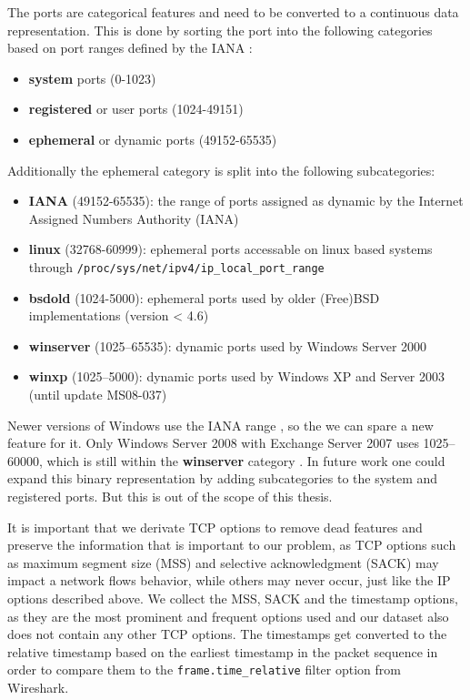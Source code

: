 \documentclass[
	ngerman,
	ruledheaders=section,%
	class=report,%
	thesis={type=bachelor},%
	accentcolor=9c,%
	custommargins=true,%
	marginpar=false,%
	parskip=half-,%
	fontsize=11pt,%
]{tudapub}
\let\code\texttt
\begin{document}
The ports are categorical features and need to be converted to a continuous data representation.
This is done by sorting the port into the following categories based on port ranges defined by the IANA \cite{ServiceNameTransport}:
\begin{itemize}
    \item \textbf{system} ports (0-1023)
    \item \textbf{registered} or user ports (1024-49151)
    \item \textbf{ephemeral} or dynamic ports (49152-65535)
\end{itemize}
Additionally the ephemeral category is split into the following subcategories:
\begin{itemize}
    \item \textbf{IANA} (49152-65535): the range of ports assigned as dynamic by the Internet Assigned Numbers Authority (IANA) \cite{ServiceNameTransport}
    \item \textbf{linux} (32768-60999): ephemeral ports accessable on linux based systems through \code{/proc/sys/net/ipv4/ip\_local\_port\_range}
    \item \textbf{bsdold} (1024-5000): ephemeral ports used by older (Free)BSD implementations (version < 4.6) \cite{EphemeralPortRange}
    \item \textbf{winserver} (1025–65535): dynamic ports used by Windows Server 2000 \cite{DefaultDynamicPort} \cite{WhenYouTry}
    \item \textbf{winxp} (1025–5000): dynamic ports used by Windows XP \cite{CableGuyDecember} and Server 2003 (until update MS08-037) \cite{YouExperienceIssues}
\end{itemize}
Newer versions of Windows use the IANA range \cite{DefaultDynamicPort}, so the we can spare a new feature for it.
Only Windows Server 2008 with Exchange Server 2007 uses 1025–60000, which is still within the \textbf{winserver} category \cite{DefaultDynamicPort}.
In future work one could expand this binary representation by adding subcategories to the system and registered ports.
But this is out of the scope of this thesis.

It is important that we derivate TCP options to remove dead features and preserve the information that is important to our problem,
as TCP options such as maximum segment size (MSS) and selective acknowledgment (SACK) may impact a network flows behavior,
while others may never occur, just like the IP options described above.
We collect the MSS, SACK and the timestamp options,
as they are the most prominent and frequent options used and
our dataset also does not contain any other TCP options.
The timestamps get converted to the relative timestamp based on the earliest timestamp in the packet sequence in order to compare them to the \code{frame.time\_relative} filter option from Wireshark.
\end{document}
